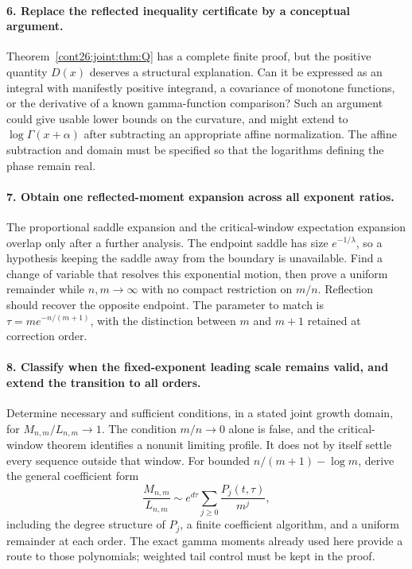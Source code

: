 \paragraph{6. Replace the reflected inequality certificate by a
conceptual argument.}
Theorem~\ref{cont26:joint:thm:Q} has a complete finite proof, but the positive
quantity $D(x)$ deserves a structural explanation.
Can it be expressed as an integral with manifestly positive
integrand, a covariance of monotone functions, or the derivative
of a known gamma-function comparison? Such an argument could
give usable lower bounds on the curvature, and might extend to
$\log\Gamma(x+\alpha)$ after subtracting an appropriate affine
normalization. The affine subtraction and domain must be specified
so that the logarithms defining the phase remain real.

\paragraph{7. Obtain one reflected-moment expansion across all
exponent ratios.}
The proportional saddle expansion and the critical-window
expectation expansion overlap only after a further analysis.
The endpoint saddle has size $e^{-1/\lambda}$, so a hypothesis
keeping the saddle away from the boundary is unavailable.
Find a change of variable that resolves this exponential motion,
then prove a uniform remainder while $n,m\to\infty$ with no
compact restriction on $m/n$. Reflection should recover the
opposite endpoint. The parameter to match is
$\tau=m e^{-n/(m+1)}$, with the distinction between $m$ and
$m+1$ retained at correction order.

\paragraph{8. Classify when the fixed-exponent leading scale remains
valid, and extend the transition to all orders.}
Determine necessary and sufficient conditions, in a stated joint
growth domain, for $M_{n,m}/L_{n,m}\to1$.
The condition $m/n\to0$ alone is false, and the critical-window
theorem identifies a nonunit limiting profile. It does not by
itself settle every sequence outside that window.
For bounded $n/(m+1)-\log m$, derive the general coefficient form
\[
 \frac{M_{n,m}}{L_{n,m}}
 \sim e^{d\tau}\sum_{j\ge0}\frac{P_j(t,\tau)}{m^j},
\]
including the degree structure of $P_j$, a finite coefficient
algorithm, and a uniform remainder at each order.
The exact gamma moments already used here provide a route to
those polynomials; weighted tail control must be kept in the proof.

